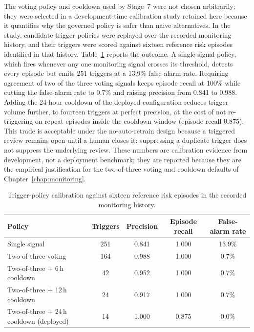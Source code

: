 The voting policy and cooldown used by Stage~7 were not chosen arbitrarily; they were selected in a development-time calibration study retained here because it quantifies why the governed policy is safer than naive alternatives. In the study, candidate trigger policies were replayed over the recorded monitoring history, and their triggers were scored against sixteen reference risk episodes identified in that history. Table~\ref{tab:ch7_triggerpolicy} reports the outcome. A single-signal policy, which fires whenever any one monitoring signal crosses its threshold, detects every episode but emits 251 triggers at a 13.9\% false-alarm rate. Requiring agreement of two of the three voting signals keeps episode recall at 100\% while cutting the false-alarm rate to 0.7\% and raising precision from 0.841 to 0.988. Adding the 24-hour cooldown of the deployed configuration reduces trigger volume further, to fourteen triggers at perfect precision, at the cost of not re-triggering on repeat episodes inside the cooldown window (episode recall 0.875). This trade is acceptable under the no-auto-retrain design because a triggered review remains open until a human closes it: suppressing a duplicate trigger does not suppress the underlying review. These numbers are calibration evidence from development, not a deployment benchmark; they are reported because they are the empirical justification for the two-of-three voting and cooldown defaults of Chapter~\ref{chap:monitoring}.

\renewcommand{\arraystretch}{1.2}
\begin{table}[htbp]
\centering
\footnotesize
\caption[Trigger-policy calibration against sixteen reference risk episodes...]{Trigger-policy calibration against sixteen reference risk episodes in the recorded monitoring history.}
\label{tab:ch7_triggerpolicy}
\begin{tabular}{lcccc}
\toprule
\textbf{Policy} & \textbf{Triggers} & \textbf{Precision} & \textbf{Episode recall} & \textbf{False-alarm rate} \\
\midrule
Single signal & 251 & 0.841 & 1.000 & 13.9\% \\
Two-of-three voting & 164 & 0.988 & 1.000 & 0.7\% \\
Two-of-three + 6\,h cooldown & 42 & 0.952 & 1.000 & 0.7\% \\
Two-of-three + 12\,h cooldown & 24 & 0.917 & 1.000 & 0.7\% \\
Two-of-three + 24\,h cooldown (deployed) & 14 & 1.000 & 0.875 & 0.0\% \\
\bottomrule
\end{tabular}
\renewcommand{\arraystretch}{1.0}
\end{table}
\FloatBarrier

